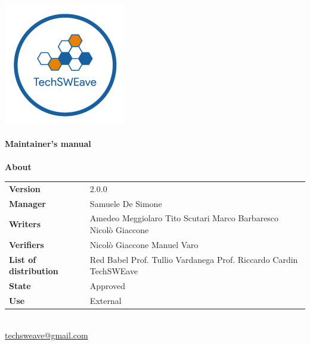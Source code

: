 \documentclass[a4paper]{article}
\begin{document}
\begin{titlepage}
    \begin{center}
        \includegraphics{../../../../Images/logo.png}\\
        \vspace{20px}
        \textcolor{logo}{\hrulefill}\\
        \vspace{20px}
        \textbf{\huge\textcolor{logo}{Maintainer's manual}}\\
        \vspace{10px}
        \textcolor{logo}{\hrulefill}\\
        \vspace{40px}
        \textbf{\Large About}\\
        \vspace{20px}
        \begin{tabular}{p{100px} | p{100px}}
            \textbf{Version}              & 2.0.0                                                                                        \\
            \textbf{Manager}              & Samuele De Simone                                                                            \\
            \textbf{Writers}              & Amedeo Meggiolaro \newline Tito Scutari \newline Marco Barbaresco \newline Nicolò Giaccone   \\
            \textbf{Verifiers}            & Nicolò Giaccone \newline Manuel Varo                                                         \\
            \textbf{List of distribution} & Red Babel \newline Prof. Tullio Vardanega \newline Prof. Riccardo Cardin \newline TechSWEave \\
            \textbf{State}                & Approved                                                                                     \\
            \textbf{Use}                  & External                                                                                     \\
        \end{tabular}\\
        \vspace{60px}
        \href{mailto:techsweave@gmail.com}{techsweave@gmail.com}\\
        

\end{center}
\end{titlepage}
\end{document}
